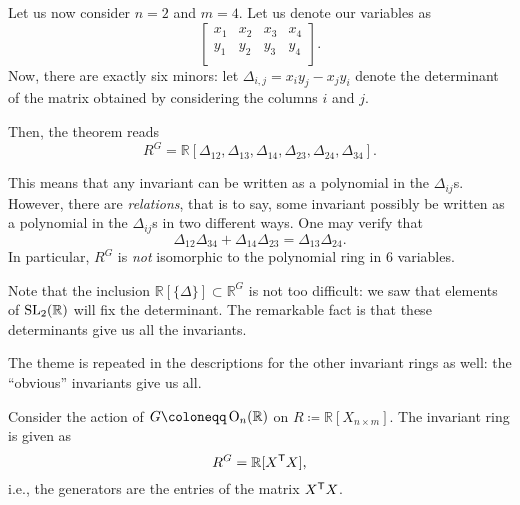 \documentclass[12pt]{article}
\begin{document}
	\begin{ex}
		Let us now consider $n = 2$ and $m = 4$. 
		Let us denote our variables as
		\begin{equation*} 
			\begin{bmatrix}
				x_{1} & x_{2} & x_{3} & x_{4} \\
				y_{1} & y_{2} & y_{3} & y_{4} \\
			\end{bmatrix}.
		\end{equation*}
		Now, there are exactly six minors: 
		let $\Delta_{i, j} = x_{i} y_{j} - x_{j} y_{i}$ 
		denote the determinant of the matrix obtained by considering the columns $i$ and $j$. 

		Then, the theorem reads
		\begin{equation*} 
			R^{G} = \mathbb{R}
			[\Delta_{12}, \Delta_{13}, \Delta_{14}, 
			\Delta_{23}, \Delta_{24}, \Delta_{34}].
		\end{equation*}

		This means that any invariant can be written as a polynomial in the $\Delta_{ij}$s. 
		However, there are \emph{relations}, that is to say, some invariant possibly be written as a polynomial in the $\Delta_{ij}$s in two different ways. 
		One may verify that
		\begin{equation*} 
			\Delta_{12} \Delta_{34} + \Delta_{14} \Delta_{23} = \Delta_{13} \Delta_{24}.
		\end{equation*}
		In particular, $R^{G}$ is \emph{not} isomorphic to the polynomial ring in $6$ variables. 
	\end{ex}

	Note that the inclusion $\mathbb{R}[\{\Delta\}] \subset \mathbb{R}^{G}$ is not too difficult: 
	we saw that elements of $\operatorname{SL}_{2}(\mathbb{R})$ will fix the determinant. 
	The remarkable fact is that these determinants give us all the invariants.

	The theme is repeated in the descriptions for the other invariant rings as well: the ``obvious'' invariants give us all.

	\begin{thm}
		Consider the action of $G \coloneqq \OO_{n}(\mathbb{R})$ on $R \coloneqq \mathbb{R}[X_{n \times m}]$. 
		The invariant ring is given as
		\begin{equation*} 
			R^{G} = \mathbb{R}[X^{\mathsf{T}} X],
		\end{equation*}
		i.e., the generators are the entries of the matrix $X^{\mathsf{T}} X$.
	\end{thm}
\end{document}
